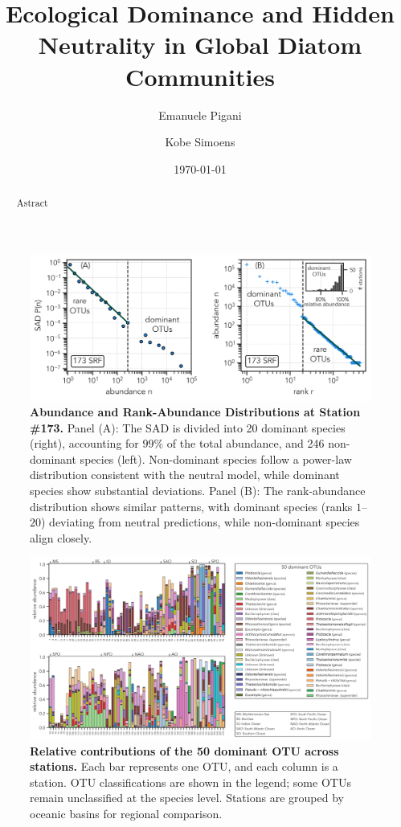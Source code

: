 \documentclass[%
 preprint,            %
 superscriptaddress, %
 amsmath,amssymb,    %
 aps,                %
 pra,                %
 floatfix,           %
]{revtex4-2}
\begin{document}
\title{Ecological Dominance and Hidden Neutrality in Global Diatom Communities}
\author{Emanuele Pigani}
\author{Kobe Simoens}

\date{\today}

\begin{abstract}
    Astract
\end{abstract}

\maketitle

\begin{figure}
    \centering
    \includegraphics[width=0.95\linewidth]{fig/173_SRF_SAD_RAD.png}
    \caption{\textbf{Abundance and Rank-Abundance Distributions at Station \#173.}
        Panel (A): The SAD is divided into 20 dominant species (right), accounting for $99\%$ of the total abundance, and 246 non-dominant species (left). Non-dominant species follow a power-law distribution consistent with the neutral model, while dominant species show substantial deviations. 
        Panel (B): The rank-abundance distribution shows similar patterns, with dominant species (ranks $1$–$20$) deviating from neutral predictions, while non-dominant species align closely.}
    \label{fig:placeholder}
\end{figure}

\begin{figure}
    \centering
    \includegraphics[width=0.95\linewidth]{fig/OTU_abundance_stacked_bar_chart.png}
    \caption{\textbf{Relative contributions of the 50 dominant OTU across stations.} Each bar represents one OTU, and each column is a station. OTU classifications are shown in the legend; some OTUs remain unclassified at the species level. Stations are grouped by oceanic basins for regional comparison.}
    \label{fig:placeholder}
\end{figure}
\end{document}
